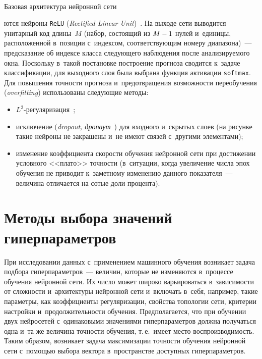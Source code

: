 \begin{multicols}{2}
{ \begin{center}  %
 \vspace*{6pt}
 \mbox{%
 \epsfxsize=79mm 
 }




\vspace*{6pt}


\noindent
{\small{Базовая архитектура нейронной сети}}
\end{center}
}



\noindent
ются нейроны \verb"ReLU" (\textit{Rectified Linear Unit})~\cite{Glorot2011}. 
На выходе сети выводится унитарный код длины~$M$ (набор, состоящий из $M\hm-1$ нулей 
и~единицы, расположенной в~позиции с~индексом, соответствующим номеру диапазона)~--- 
предсказание об индексе класса следующего наблюдения после анализируемого окна. 
Поскольку в~такой постановке построение прогноза сводится к~задаче классификации, 
для выходного слоя была выбрана функция активации \verb"softmax". 
Для повышения точности прогноза и~предотвращения возможности переобучения 
(\textit{overfitting}) использованы следующие методы:
\begin{itemize}
\item $L^2$-регуляризация~\cite{Tikhonov1998};\\[-14pt]
\item исключение (\textit{dropout, дропаут}~\cite{Srivastava2014}) 
для входного и~скрытых слоев (на рисунке такие нейроны 
не закрашены и~не имеют связей с~другими элементами);\\[-14pt]
\item изменение коэффициента скорости обучения нейронной сети при 
достижении условного <<плато>>  точности (в~ситуации, когда увеличение 
числа эпох обучения не приводит к~заметному изменению данного показателя~--- 
величина отличается на сотые доли процента).
\end{itemize}

\vspace*{-8pt}

 \section{Методы выбора значений гиперпараметров}
 
 \vspace*{-2pt}

При исследовании данных с~применением машинного обучения возникает задача 
подбора гиперпараметров~--- величин, которые не изменяются в~процессе обучения 
нейронной сети. Их число может широко варьироваться в~зависимости от 
сложности и~архитектуры нейронной сети и~включать в~себя, например, 
такие параметры, как коэффициенты регуляризации, свойства топологии сети, 
критерии настройки и~продолжительности обучения. Предполагается, что при 
обучении двух нейросетей с~одинаковыми значениями гиперпараметров должна
получаться одна и~та же величина 
точности обучения, т.\,е.\ имеет мес\-то воспроизводимость. Таким образом, 
возникает задача максимизации точности обучения нейронной сети с~по\-мощью выбора 
вектора в~пространстве доступных ги\-пер\-па\-ра\-мет\-ров.


\end{multicols}
